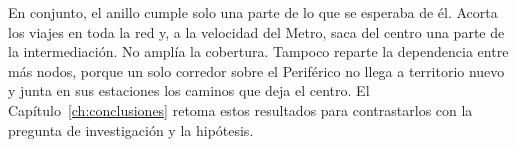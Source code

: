 En conjunto, el anillo cumple solo una parte de lo que se esperaba de él. Acorta
los viajes en toda la red y, a la velocidad del Metro, saca del centro una parte
de la intermediación. No amplía la cobertura. Tampoco reparte la dependencia
entre más nodos, porque un solo corredor sobre el Periférico no llega a
territorio nuevo y junta en sus estaciones los caminos que deja el centro. El
Capítulo~\ref{ch:conclusiones} retoma estos resultados para contrastarlos con la
pregunta de investigación y la hipótesis.

